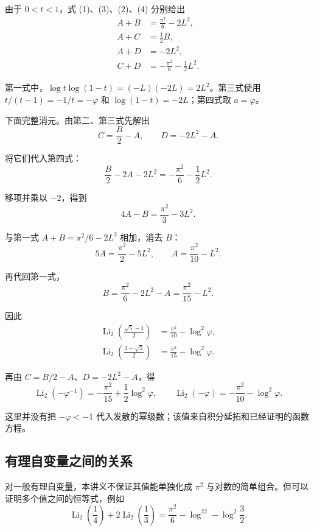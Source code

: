 \documentclass[11pt,a4paper]{article}
\begin{document}
由于 \(0<t<1\)，式 (1)、(3)、(2)、(4) 分别给出
\[
\begin{aligned}
A+B&=\frac{\pi^2}{6}-2L^2,\\
A+C&=\frac12B,\\
A+D&=-2L^2,\\
C+D&=-\frac{\pi^2}{6}-\frac12L^2.
\end{aligned}
\]

第一式中，\(\log t\log(1-t)=(-L)(-2L)=2L^2\)。第三式使用
\(t/(t-1)=-1/t=-\varphi\) 和 \(\log(1-t)=-2L\)；第四式取 \(a=\varphi\)。

下面完整消元。由第二、第三式先解出
\[
C=\frac B2-A,\qquad D=-2L^2-A.
\]

将它们代入第四式：
\[
\frac B2-2A-2L^2=-\frac{\pi^2}{6}-\frac12L^2.
\]

移项并乘以 \(-2\)，得到
\[
4A-B=\frac{\pi^2}{3}-3L^2.
\]

与第一式 \(A+B=\pi^2/6-2L^2\) 相加，消去 \(B\)：
\[
5A=\frac{\pi^2}{2}-5L^2,
\qquad A=\frac{\pi^2}{10}-L^2.
\]

再代回第一式，
\[
B=\frac{\pi^2}{6}-2L^2-A
=\frac{\pi^2}{15}-L^2.
\]

因此
\[
\begin{aligned}
\operatorname{Li}_2\!\left(\frac{\sqrt5-1}{2}\right)
&=\frac{\pi^2}{10}-\log^2\varphi,\\
\operatorname{Li}_2\!\left(\frac{3-\sqrt5}{2}\right)
&=\frac{\pi^2}{15}-\log^2\varphi.
\end{aligned}
\]

再由 \(C=B/2-A\)、\(D=-2L^2-A\)，得
\[
\operatorname{Li}_2(-\varphi^{-1})=-\frac{\pi^2}{15}+\frac12\log^2\varphi,
\qquad
\operatorname{Li}_2(-\varphi)=-\frac{\pi^2}{10}-\log^2\varphi.
\]

这里并没有把 \(-\varphi<-1\)
代入发散的幂级数；该值来自积分延拓和已经证明的函数方程。

\hypertarget{ux6709ux7406ux81eaux53d8ux91cfux4e4bux95f4ux7684ux5173ux7cfb}{%
\subsection{有理自变量之间的关系}\label{ux6709ux7406ux81eaux53d8ux91cfux4e4bux95f4ux7684ux5173ux7cfb}}

对一般有理自变量，本讲义不保证其值能单独化成 \(\pi^2\)
与对数的简单组合。但可以证明多个值之间的恒等式，例如
\begin{equation}
\operatorname{Li}_2\!\left(\frac14\right)
+2\operatorname{Li}_2\!\left(\frac13\right)
=\frac{\pi^2}{6}-\log^22-\log^2\!\frac32.
\tag{6}
\end{equation}
\end{document}
